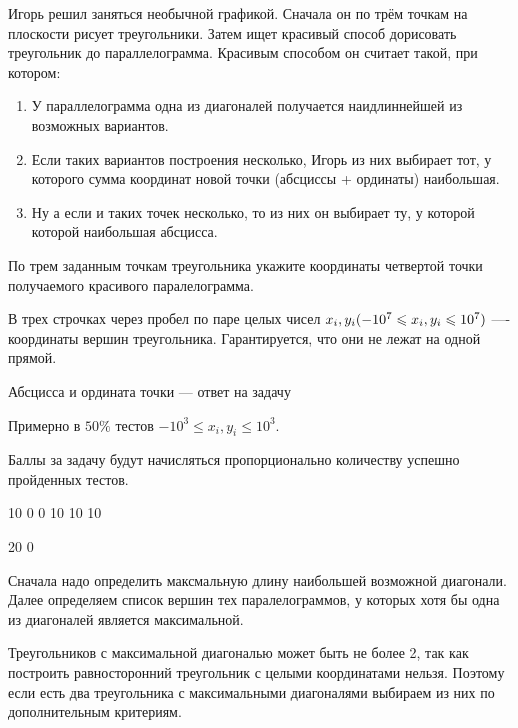 
Игорь решил заняться необычной графикой. Сначала он по трём точкам на плоскости рисует треугольники. Затем ищет красивый способ дорисовать треугольник до параллелограмма. Красивым способом он считает такой, при котором:

\begin{enumerate}
\item У параллелограмма одна из диагоналей получается наидлиннейшей из возможных вариантов. 
\item Если таких вариантов построения несколько, Игорь из них выбирает тот, у которого сумма координат новой точки (абсциссы + ординаты) наибольшая. 
\item Ну а если и таких точек несколько, то из них он выбирает ту, у которой которой наибольшая абсцисса.
\end{enumerate}

По трем заданным точкам треугольника укажите координаты четвертой точки получаемого красивого паралелограмма.


В трех строчках через пробел по паре целых чисел $ x_i, y_i\space (-10^7\leq x_i, y_i \leq 10^7) $ —- координаты вершин треугольника. Гарантируется, что они не лежат на одной прямой.

\outputfmtSection

Абсцисса и ордината точки — ответ на задачу

\markSection

Примерно в $ 50\% $ тестов $ -10^3 \leq x_i, y_i \leq 10^3 $.

Баллы за задачу будут начисляться пропорционально количеству успешно пройденных тестов.


\begin{myverbbox}[\small]{\vinput}
    10 0 0 10 10 10
\end{myverbbox}

\begin{myverbbox}[\small]{\voutput}
    20 0
\end{myverbbox}

\solutionSection

Сначала надо определить максмальную длину наибольшей возможной диагонали. Далее определяем список вершин тех паралелограммов, у которых хотя бы одна из диагоналей является максимальной. 

Треугольников с максимальной диагональю может быть не более 2, так как построить равносторонний треугольник с целыми координатами нельзя. Поэтому если есть два треугольника с максимальными диагоналями выбираем из них по дополнительным критериям. 

